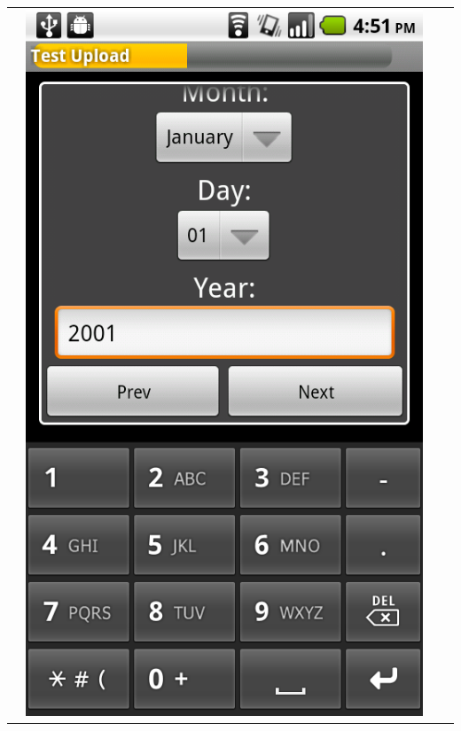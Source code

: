 \documentclass[a4paper,10pt]{article}
\begin{document}
\begin{flushleft}
\begin{tabular}{ c c c c }
&\includegraphics[scale=0.15,keepaspectratio=true]{client_proc_pt_dob.png} \\

\end{tabular}
\end{flushleft}
\end{document}
